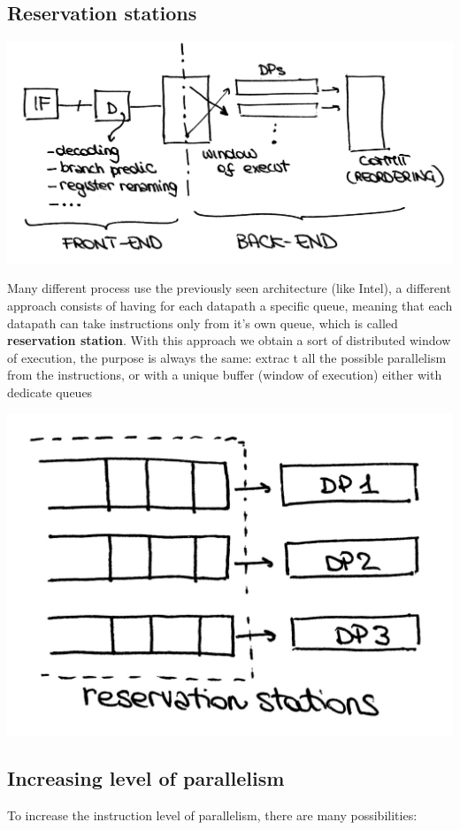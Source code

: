 \subsection{Reservation stations}
\begin{center}
  \includegraphics[width=0.7\linewidth]{img/img3/4}
\end{center}

Many different process use the previously seen architecture (like Intel), a
different approach consists of having for each datapath a specific queue,
meaning that each datapath can take instructions only from it's own queue,
which is called \textbf{reservation station}. With this approach we obtain a 
sort of distributed window of execution, the purpose is always the same: extrac
t all the possible parallelism from the instructions, or with a unique buffer 
(window of execution) either with dedicate queues

\begin{center}
  \includegraphics[width=0.5\linewidth]{img/img3/5}
\end{center}

\subsection{Increasing level of parallelism}
To increase the instruction level of parallelism, there are many possibilities:

